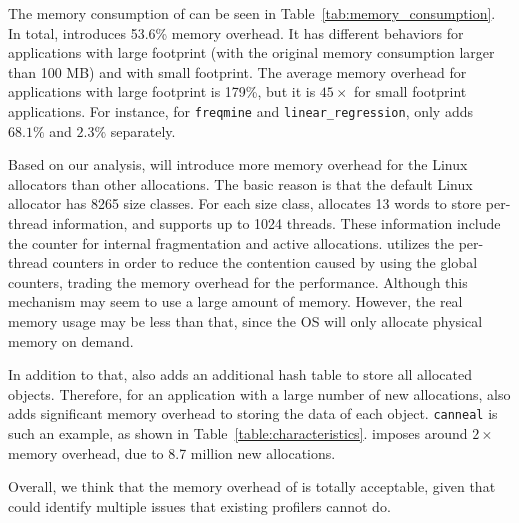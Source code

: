 The memory consumption of \MP{} can be seen in Table~\ref{tab:memory_consumption}. In total, \MP{} introduces 53.6\% memory overhead. It has different behaviors for applications with large footprint (with the original memory consumption larger than 100 MB) and with small footprint. The average memory overhead for applications with large footprint is 179\%, but it is $45\times$ for small footprint applications. For instance, for \texttt{freqmine} and \texttt{linear\_regression}, \MP{} only adds $68.1\%$ and $2.3\%$ separately. 

Based on our analysis, \MP{} will introduce 
more memory overhead for the Linux allocators than other allocations. The basic reason is that the default Linux allocator has 8265
size classes. For each size class, \MP{} allocates 13 words to store per-thread information, and supports up to 1024 threads. These information include the counter for internal fragmentation and active allocations. \MP{} utilizes the per-thread counters in order to reduce the contention caused by using the global counters, trading the memory overhead for the performance. Although this mechanism may seem to use a large amount of memory. However, the real memory usage may be less than that, since the OS will only allocate physical memory on demand. 

In addition to that, \MP{} also adds an additional hash table to store all allocated objects. Therefore, for an application with a large number of new allocations, \MP{} also adds significant memory overhead to storing the data of each object. \texttt{canneal} is such an example, as shown in Table~\ref{table:characteristics}. \MP{} imposes around $2\times$ memory overhead, due to 8.7 million new allocations. 
 
Overall, we think that the memory overhead of \MP{} is totally acceptable, given that \MP{} could identify multiple issues that existing profilers cannot do. 


